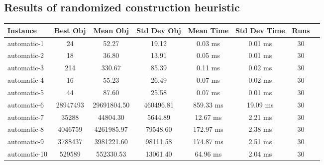 \documentclass[11pt]{article}
\begin{document}
\subsection{Results of randomized construction heuristic}
{
\center
\begin{tabular}{l*{6}{c}r}
Instance & Best Obj & Mean Obj & Std Dev Obj & Mean Time & Std Dev Time & Runs \\
\hline
automatic-1 & 24 & 52.27 & 19.12 & 0.03 ms & 0.01 ms & 30 \\
automatic-2 & 18 & 36.80 & 13.91 & 0.05 ms & 0.01 ms & 30 \\
automatic-3 & 214 & 330.67 & 85.39 & 0.11 ms & 0.02 ms & 30 \\
automatic-4 & 16 & 55.23 & 26.49 & 0.07 ms & 0.02 ms & 30 \\
automatic-5 & 44 & 87.60 & 25.58 & 0.07 ms & 0.01 ms & 30 \\
automatic-6 & 28947493 & 29691804.50 & 460496.81 & 859.33 ms & 19.09 ms & 30 \\
automatic-7 & 35288 & 44804.30 & 5644.89 & 12.67 ms & 2.21 ms & 30 \\
automatic-8 & 4046759 & 4261985.97 & 79548.60 & 172.97 ms & 2.38 ms & 30 \\
automatic-9 & 3788437 & 3981221.60 & 98111.58 & 174.87 ms & 2.51 ms & 30 \\
automatic-10 & 529589 & 552330.53 & 13061.40 & 64.96 ms & 2.04 ms & 30 \\
\end{tabular}
}
\end{document}
